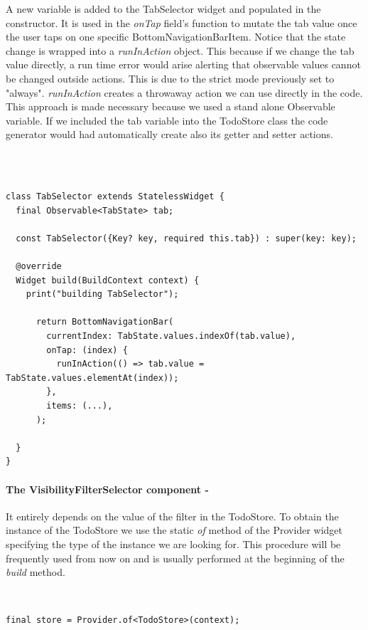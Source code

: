 A new variable is added to the TabSelector widget and populated in the constructor. It is used in the \textit{onTap} field’s function to mutate the tab value once the user taps on one specific BottomNavigationBarItem. Notice that the state change is wrapped into a \textit{runInAction} object. This because if we change the tab value directly, a run time error would arise alerting that observable values cannot be changed outside actions. This is due to the strict mode previously set to "always". \textit{runInAction} creates a throwaway action we can use directly in the code. This approach is made necessary because we used a stand alone Observable variable. If we included the tab variable into the TodoStore class the code generator would had automatically create also its getter and setter actions.


\begin{code}
\mbox{}\\
 \mbox{}
		\label{code:2.14}
\begin{verbatim}

class TabSelector extends StatelessWidget {
  final Observable<TabState> tab;

  const TabSelector({Key? key, required this.tab}) : super(key: key);

  @override
  Widget build(BuildContext context) {
    print("building TabSelector");

      return BottomNavigationBar(
        currentIndex: TabState.values.indexOf(tab.value),
        onTap: (index) {
          runInAction(() => tab.value = TabState.values.elementAt(index));
        },
        items: (...),
      );

  }
}
\end{verbatim}
\mbox{}
\end{code}
\paragraph{The VisibilityFilterSelector component - }
\label{subpar:todo_app_bloc_core_state}It entirely depends on the value of the filter in the TodoStore. To obtain the instance of the TodoStore we use the static \textit{of} method of the Provider widget specifying the type of the instance we are looking for. This procedure will be frequently used from now on and is usually performed at the beginning of the \textit{build} method. 
\begin{code}
\mbox{}\\
 \mbox{}
		\label{code:2.14}
\begin{verbatim}
final store = Provider.of<TodoStore>(context);
\end{verbatim}
\mbox{}
\end{code}


